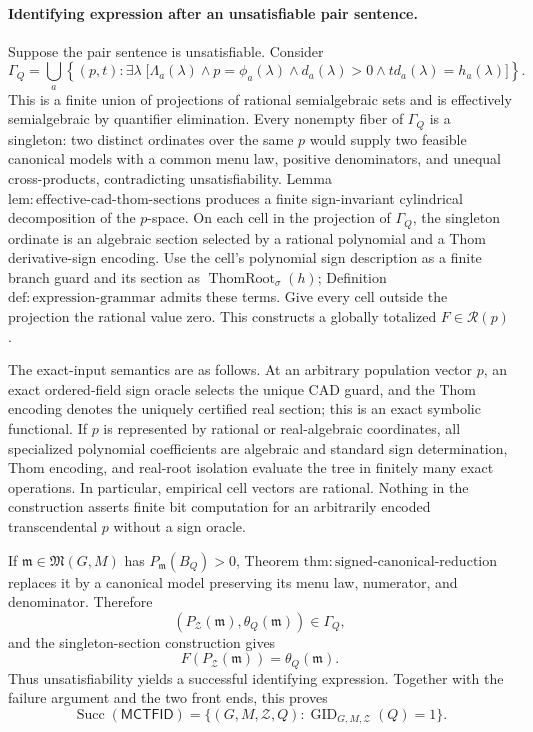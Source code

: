 \paragraph{Identifying expression after an unsatisfiable pair sentence.}
Suppose the pair sentence is unsatisfiable.  Consider
\[
 \Gamma_Q
 =\bigcup_a\left\{(p,t):
 \exists\lambda\;\bigl[
 \Lambda_a(\lambda)\wedge p=\phi_a(\lambda)
 \wedge d_a(\lambda)>0\wedge t d_a(\lambda)=h_a(\lambda)
 \bigr]\right\}.
\]
This is a finite union of projections of rational semialgebraic sets and is effectively semialgebraic by quantifier elimination.  Every nonempty fiber of \(\Gamma_Q\) is a singleton: two distinct ordinates over the same \(p\) would supply two feasible canonical models with a common menu law, positive denominators, and unequal cross-products, contradicting unsatisfiability.  Lemma \(\mathrm{lem:effective\text{-}cad\text{-}thom\text{-}sections}\) produces a finite sign-invariant cylindrical decomposition of the \(p\)-space.  On each cell in the projection of \(\Gamma_Q\), the singleton ordinate is an algebraic section selected by a rational polynomial and a Thom derivative-sign encoding.  Use the cell's polynomial sign description as a finite branch guard and its section as \(\operatorname{ThomRoot}_{\sigma}(h)\); Definition \(\mathrm{def:expression\text{-}grammar}\) admits these terms.  Give every cell outside the projection the rational value zero.  This constructs a globally totalized \(F\in\mathcal R(p)\).

The exact-input semantics are as follows.  At an arbitrary population vector \(p\), an exact ordered-field sign oracle selects the unique CAD guard, and the Thom encoding denotes the uniquely certified real section; this is an exact symbolic functional.  If \(p\) is represented by rational or real-algebraic coordinates, all specialized polynomial coefficients are algebraic and standard sign determination, Thom encoding, and real-root isolation evaluate the tree in finitely many exact operations.  In particular, empirical cell vectors are rational.  Nothing in the construction asserts finite bit computation for an arbitrarily encoded transcendental \(p\) without a sign oracle.

If \(\mathfrak m\in\mathfrak M(G,M)\) has \(P_{\mathfrak m}(B_Q)>0\), Theorem \(\mathrm{thm:signed\text{-}canonical\text{-}reduction}\) replaces it by a canonical model preserving its menu law, numerator, and denominator.  Therefore
\[
 \left(P_{\mathcal Z}(\mathfrak m),\theta_Q(\mathfrak m)\right)\in\Gamma_Q,
\]
and the singleton-section construction gives
\[
 F(P_{\mathcal Z}(\mathfrak m))=\theta_Q(\mathfrak m).
\]
Thus unsatisfiability yields a successful identifying expression.  Together with the failure argument and the two front ends, this proves
\[
 \operatorname{Succ}(\mathsf{MCTFID})
 =\{(G,M,\mathcal Z,Q):\operatorname{GID}_{G,M,\mathcal Z}(Q)=1\}.
\]

